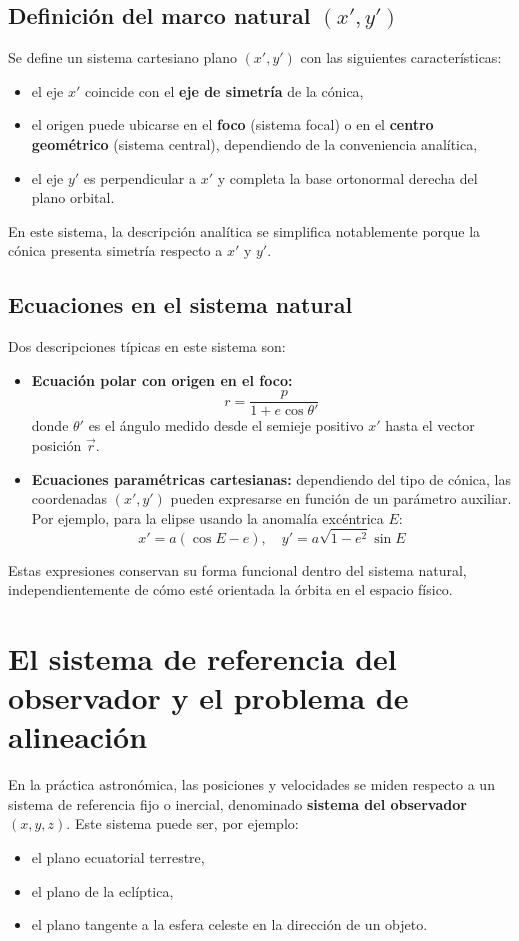 \subsection{Definición del marco natural \texorpdfstring{$(x',y')$}{(x',y')}}
Se define un sistema cartesiano plano \((x', y')\) con las siguientes características:
\begin{itemize}
    \item el eje \(x'\) coincide con el \textbf{eje de simetría} de la cónica,
    \item el origen puede ubicarse en el \textbf{foco} (sistema focal) o en el \textbf{centro geométrico} (sistema central), dependiendo de la conveniencia analítica,
    \item el eje \(y'\) es perpendicular a \(x'\) y completa la base ortonormal derecha del plano orbital.
\end{itemize}

En este sistema, la descripción analítica se simplifica notablemente porque la cónica presenta simetría respecto a \(x'\) y \(y'\).

\subsection{Ecuaciones en el sistema natural}
Dos descripciones típicas en este sistema son:
\begin{itemize}
    \item \textbf{Ecuación polar con origen en el foco:}
\[
 r = \frac{p}{1 + e\cos\theta'}
\]
    donde \(\theta'\) es el ángulo medido desde el semieje positivo \(x'\) hasta el vector posición \(\vec{r}\).
    \item \textbf{Ecuaciones paramétricas cartesianas:} dependiendo del tipo de cónica, las coordenadas \((x', y')\) pueden expresarse en función de un parámetro auxiliar. Por ejemplo, para la elipse usando la anomalía excéntrica \(E\):
\[
 x' = a(\cos E - e), \quad y' = a\sqrt{1-e^2}\sin E
\]
\end{itemize}

Estas expresiones conservan su forma funcional dentro del sistema natural, independientemente de cómo esté orientada la órbita en el espacio físico.

\section{El sistema de referencia del observador y el problema de alineación}
En la práctica astronómica, las posiciones y velocidades se miden respecto a un sistema de referencia fijo o inercial, denominado \textbf{sistema del observador} $(x,y,z)$. Este sistema puede ser, por ejemplo:
\begin{itemize}
    \item el plano ecuatorial terrestre,
    \item el plano de la eclíptica,
    \item el plano tangente a la esfera celeste en la dirección de un objeto.
\end{itemize}

